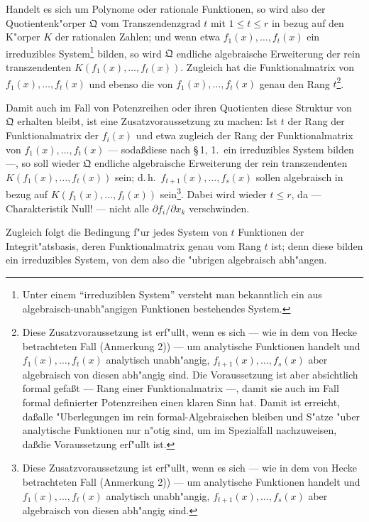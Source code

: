 \documentclass[12pt,a4paper]{article}
\theoremstyle{plain}
\begin{document}
Handelt es sich um Polynome oder rationale Funktionen, so wird also der Quotientenk"orper $\mathfrak{Q}$ vom Transzendenzgrad $t$ mit $1 \leq t \leq r$ in bezug auf den K"orper $K$ der rationalen Zahlen; und wenn etwa $f_1(x),\ldots,f_t(x)$ ein irreduzibles System\footnote{Unter einem ``irreduziblen System'' versteht man bekanntlich ein aus algebraisch-unabh"angigen Funktionen bestehendes System.} bilden, so wird $\mathfrak{Q}$ endliche algebraische Erweiterung der rein transzendenten $K(f_1(x),\ldots,f_t(x))$. Zugleich hat die Funktionalmatrix von $f_1(x),\ldots,f_t(x)$ und ebenso die von $f_1(x),\ldots,f_t(x)$ genau den Rang $t$\footnote{Diese Zusatzvoraussetzung ist erf"ullt, wenn es sich --- wie in dem von Hecke betrachteten Fall (Anmerkung 2)) --- um analytische Funktionen handelt und $f_1(x),\ldots,f_t(x)$ analytisch unabh"angig, $f_{t+1}(x),\ldots,f_s(x)$ aber algebraisch von diesen abh"angig sind. Die Voraussetzung ist aber absichtlich formal gefa\ss t --- Rang einer Funktionalmatrix ---, damit sie auch im Fall formal definierter Potenzreihen einen klaren Sinn hat. Damit ist erreicht, da\ss alle "Uberlegungen im rein formal-Algebraischen bleiben und S"atze "uber analytische Funktionen nur n"otig sind, um im Spezialfall nachzuweisen, da\ss die Voraussetzung erf"ullt ist.}.

Damit auch im Fall von Potenzreihen oder ihren Quotienten diese Struktur von $\mathfrak{Q}$ erhalten bleibt, ist eine Zusatzvoraussetzung zu machen: Ist $t$ der Rang der Funktionalmatrix der $f_i(x)$ und etwa zugleich der Rang der Funktionalmatrix von $f_1(x),\ldots,f_t(x)$ --- soda\ss diese nach \S\,1, 1.\ ein irreduzibles System bilden ---, so soll wieder $\mathfrak{Q}$ endliche algebraische Erweiterung der rein transzendenten $K(f_1(x),\ldots,f_t(x))$ sein; d.\,h.\ $f_{t+1}(x),\ldots,f_s(x)$ sollen algebraisch in bezug auf $K(f_1(x),\ldots,f_t(x))$ sein\footnote{Diese Zusatzvoraussetzung ist erf"ullt, wenn es sich --- wie in dem von Hecke betrachteten Fall (Anmerkung 2)) --- um analytische Funktionen handelt und $f_1(x),\ldots,f_t(x)$ analytisch unabh"angig, $f_{t+1}(x),\ldots,f_s(x)$ aber algebraisch von diesen abh"angig sind.}. Dabei wird wieder $t \leq r$, da --- Charakteristik Null! --- nicht alle $\partial f_i/\partial x_k$ verschwinden.

Zugleich folgt die Bedingung f"ur jedes System von $t$ Funktionen der Integrit"atsbasis, deren Funktionalmatrix genau vom Rang $t$ ist; denn diese bilden ein irreduzibles System, von dem also die "ubrigen algebraisch abh"angen.
\end{document}
